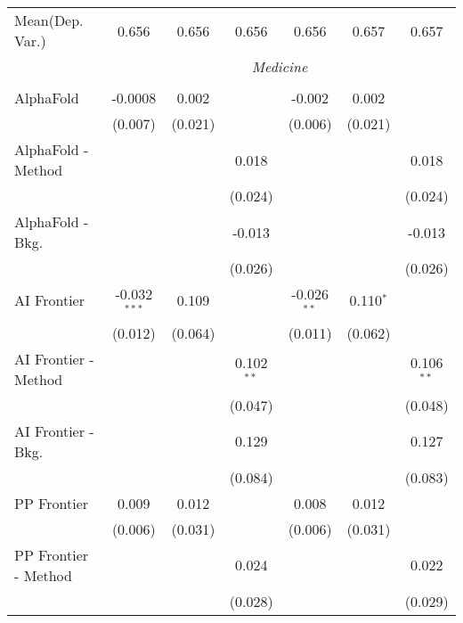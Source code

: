\begin{tabular}{lcccccc}
Mean(Dep. Var.) & 0.656 & 0.656 & 0.656 & 0.656 & 0.657 & 0.657 \\
 & \multicolumn{6}{c}{\textit{Medicine}} \\ \\
   AlphaFold            & -0.0008        & 0.002   &              & -0.002        & 0.002       &   \\   
                        & (0.007)        & (0.021) &              & (0.006)       & (0.021)     &   \\   
   AlphaFold - Method   &                &         & 0.018        &               &             & 0.018\\   
                        &                &         & (0.024)      &               &             & (0.024)\\   
   AlphaFold - Bkg.     &                &         & -0.013       &               &             & -0.013\\   
                        &                &         & (0.026)      &               &             & (0.026)\\   
   AI Frontier          & -0.032$^{***}$ & 0.109   &              & -0.026$^{**}$ & 0.110$^{*}$ &   \\   
                        & (0.012)        & (0.064) &              & (0.011)       & (0.062)     &   \\   
   AI Frontier - Method &                &         & 0.102$^{**}$ &               &             & 0.106$^{**}$\\   
                        &                &         & (0.047)      &               &             & (0.048)\\   
   AI Frontier - Bkg.   &                &         & 0.129        &               &             & 0.127\\   
                        &                &         & (0.084)      &               &             & (0.083)\\   
   PP Frontier          & 0.009          & 0.012   &              & 0.008         & 0.012       &   \\   
                        & (0.006)        & (0.031) &              & (0.006)       & (0.031)     &   \\   
   PP Frontier - Method &                &         & 0.024        &               &             & 0.022\\   
                        &                &         & (0.028)      &               &             & (0.029)\\   

\end{tabular}
